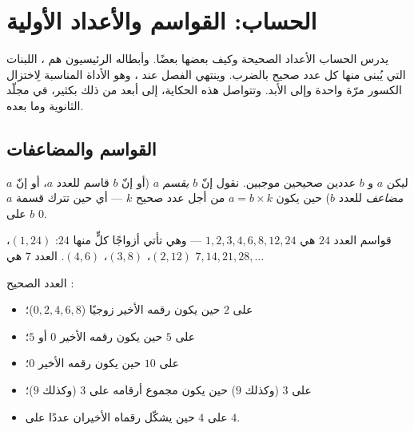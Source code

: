 \chapter{الحساب: القواسم والأعداد الأولية}\label{ch:g9:arith}

يدرس الحساب الأعداد الصحيحة وكيف  بعضها بعضًا. وأبطاله
الرئيسيون هم ، اللبنات التي يُبنى منها كل
عدد صحيح بالضرب. وينتهي الفصل عند ، وهو الأداة
المناسبة لِاختزال الكسور مرّة واحدة وإلى الأبد. وتتواصل هذه
الحكاية، إلى أبعد من ذلك بكثير، في مجلّد الثانوية وما بعده.

\section{القواسم والمضاعفات}

\begin{definition}\label{def:g9:arith:divisor}
ليكن $a$ و $b$ عددين صحيحين موجبين. نقول إنّ $b$
\emph{يقسم} $a$ (أو إنّ $b$ قاسم للعدد $a$، أو إنّ
$a$ \emph{مضاعف} للعدد $b$) حين يكون $a = b \times
k$ من أجل عدد صحيح $k$ --- أي حين تترك قسمة $a$ على $b$
 $0$.
\end{definition}

\begin{example}
قواسم العدد $24$ هي $1, 2, 3, 4, 6, 8, 12, 24$ --- وهي تأتي
أزواجًا  كلٍّ منها $24$: $(1,24)$، $(2,12)$، $(3,8)$، $(4,6)$.
 العدد $7$ هي $7, 14, 21, 28, \dots$
\end{example}

\begin{proposition}\label{prop:g9:arith:rules}
العدد الصحيح :
\begin{itemize}
  \item على $2$ حين يكون رقمه الأخير زوجيًا ($0, 2, 4, 6, 8$)؛
  \item على $5$ حين يكون رقمه الأخير $0$ أو $5$؛
  \item على $10$ حين يكون رقمه الأخير $0$؛
  \item على $3$ (وكذلك $9$) حين يكون مجموع أرقامه 
        على $3$ (وكذلك $9$)؛
  \item على $4$ حين يشكّل رقماه الأخيران عددًا  على $4$.
\end{itemize}
\end{proposition}
\admitted

